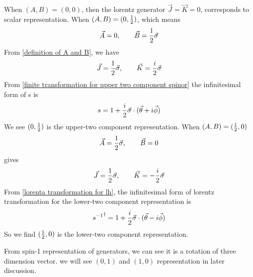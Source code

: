When $(A,B)= (0,0)$, then the lorentz generator $\vec{J}=\vec{K}=0$,  corresponds to scalar representation. 
When $(A,B)=(0,\frac{1}{2})$, which means
\begin{equation}\label{A,B value for (0,1/2)}
    \vec{A} = 0, \qquad \vec{B} = \frac{1}{2} \vec{\sigma} 
\end{equation}
From \eqref{definition of A and B}, we have
\begin{equation}
    \vec{J} = \frac{1}{2} \vec{\sigma},\qquad \vec{K}=  \frac{i}{2}\vec{\sigma}
\end{equation}
From  \eqref{finite transformation for upper two component spinor}
the infinitesimal form of s is
\begin{equation}
 s = 1 + \frac{i}{2} \vec{\sigma}\cdot(\vec{\theta}+i\vec{\phi})
\end{equation} 
We see $(0,\frac{1}{2})$ is the upper-two component representation.
When $(A,B)=(\frac{1}{2},0)$
\begin{equation}\label{A,B value for (1/2,0)}
    \vec{A}= \frac{1}{2} \vec{\sigma}, \qquad \vec{B} = 0 
\end{equation}
gives
\begin{equation}
    \vec{J} = \frac{1}{2} \vec{\sigma}, \qquad \vec{K} =  -\frac{i}{2}\vec{\sigma}
\end{equation}
From \eqref{lorenta transformation for lh}, the infinitesimal form of lorentz transformation for the lower-two component representation is
\begin{equation}
{s^{-1}}^{\dagger} = 1 + \frac{i}{2}\vec{\sigma}\cdot(\vec{\theta}-i\vec{\phi})
\end{equation}
So we find $(\frac{1}{2},0)$ is the lower-two component representation.

From spin-1 representation of generators, we can see it is a rotation of three dimension vector. we will see $(0,1)$ and $(1,0)$ representation in later discussion.

